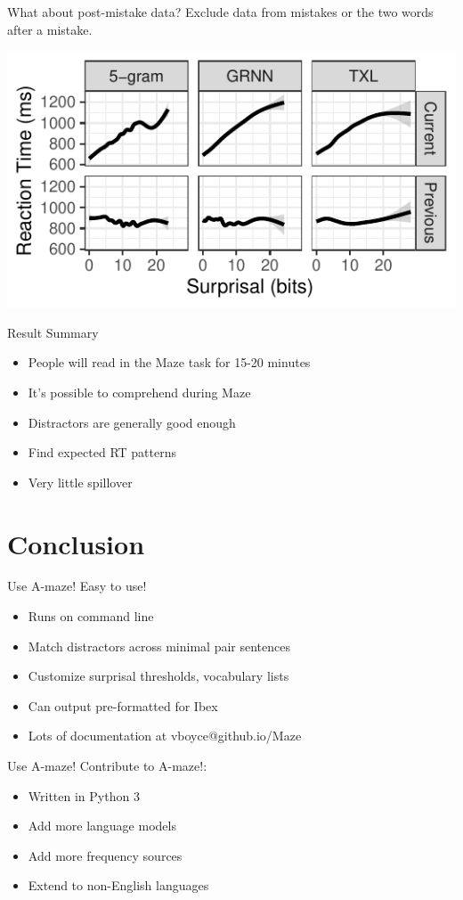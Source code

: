 \documentclass[12pt, xcolor=beamer,table,usenames,dvipsnames, ignorenonframetext, ngerman]{beamer}
\begin{document}
\begin{frame}{What about post-mistake data?}
Exclude data from mistakes or the two words after a mistake. 

\includegraphics[width=.9\textwidth]{gam2.pdf}	
\end{frame}

\begin{frame}{Result Summary}
\begin{itemize}
	\item People will read in the Maze task for 15-20 minutes
	\item It's possible to comprehend during Maze
	\item Distractors are generally good enough
	\item Find expected RT patterns
	\item Very little spillover
\end{itemize}
\end{frame}
\section{Conclusion}

\begin{frame}{Use A-maze!}
Easy to use!
\begin{itemize}
	\item Runs on command line 
	\item Match distractors across minimal pair sentences
	\item Customize surprisal thresholds, vocabulary lists
	\item Can output pre-formatted for Ibex
	\item Lots of documentation at vboyce@github.io/Maze
\end{itemize}
\medskip
\pause
\end{frame}

\begin{frame}{Use A-maze!}
Contribute to A-maze!:
\begin{itemize}
	\item Written in Python 3
	\item Add more language models
	\item Add more frequency sources
	\item Extend to non-English languages
\end{itemize}

\end{frame}
\end{document}
